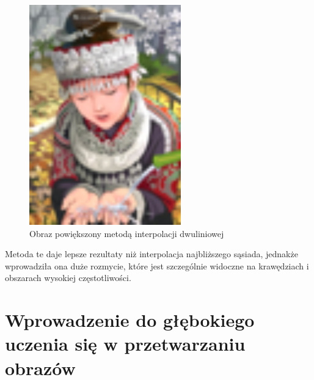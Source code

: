 \begin{figure}[ht]
\begin{minipage}[t]{0.35\linewidth}
        \includegraphics[width=\linewidth]{Rozdziały/02.Podstawy_teoretyczne/comic_BILINEARx4.png}
        \caption{Obraz powiększony metodą interpolacji dwuliniowej}
        \label{fig:image10}
    \end{minipage}
\end{figure}


Metoda te daje lepsze rezultaty niż interpolacja najbliższego sąsiada, jednakże wprowadziła ona duże rozmycie, które jest szczególnie widoczne na krawędziach i obszarach wysokiej częstotliwości.






\newpage
\section{Wprowadzenie do głębokiego uczenia się w przetwarzaniu obrazów}


